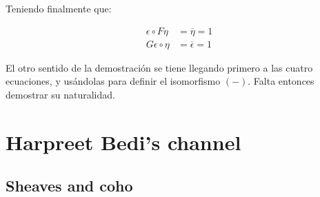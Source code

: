 \documentclass[11pt]{article}
\begin{document}
Teniendo finalmente que:

\[ \begin{aligned}
\epsilon \circ F\eta &= \overline{\eta} = 1 \\
G\epsilon \circ \eta &= \overline{\epsilon} = 1
\end{aligned} \]

El otro sentido de la demostración se tiene llegando primero a las
cuatro ecuaciones, y usándolas para definir el isomorfismo
$(-)$. Falta entonces demostrar su naturalidad.

\section*{Harpreet Bedi's channel}
\label{sec-3}
\subsection*{Sheaves and coho}
\label{sec-3-1}
\end{document}
